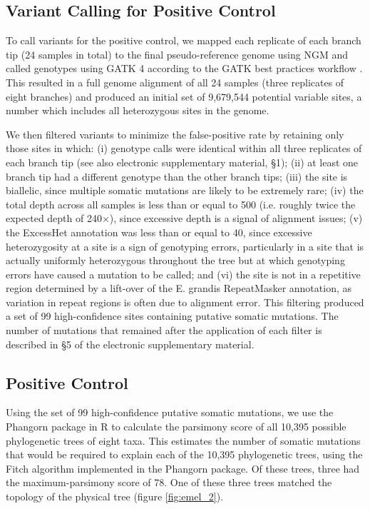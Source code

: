 \subsection{Variant Calling for Positive Control}

To call variants for the positive control, we mapped each replicate of each branch tip (24 samples in total) to the final pseudo-reference genome using NGM and called genotypes using GATK 4 according to the GATK best practices workflow \parencite{auwera_fastq_2013}. This resulted in a full genome alignment of all 24 samples (three replicates of eight branches) and produced an initial set of 9,679,544 potential variable sites, a number which includes all heterozygous sites in the genome.

We then filtered variants to minimize the false-positive rate by retaining only those sites in which: (i) genotype calls were identical within all three replicates of each branch tip (see also electronic supplementary material, §1); (ii) at least one branch tip had a different genotype than the other branch tips; (iii) the site is biallelic, since multiple somatic mutations are likely to be extremely rare; (iv) the total depth across all samples is less than or equal to 500 (i.e. roughly twice the expected depth of 240×), since excessive depth is a signal of alignment issues; (v) the ExcessHet annotation was less than or equal to 40, since excessive heterozygosity at a site is a sign of genotyping errors, particularly in a site that is actually uniformly heterozygous throughout the tree but at which genotyping errors have caused a mutation to be called; and (vi) the site is not in a repetitive region determined by a lift-over of the E. grandis RepeatMasker annotation, as variation in repeat regions is often due to alignment error. This filtering produced a set of 99 high-confidence sites containing putative somatic mutations. The number of mutations that remained after the application of each filter is described in §5 of the electronic supplementary material.

\subsection{Positive Control}

Using the set of 99 high-confidence putative somatic mutations, we use the Phangorn package in R \parencite{schliep_phangorn_2011} to calculate the parsimony score of all 10,395 possible phylogenetic trees of eight taxa. This estimates the number of somatic mutations that would be required to explain each of the 10,395 phylogenetic trees, using the Fitch algorithm implemented in the Phangorn package. Of these trees, three had the maximum-parsimony score of 78. One of these three trees matched the topology of the physical tree (figure \ref{fig:emel_2}). 

